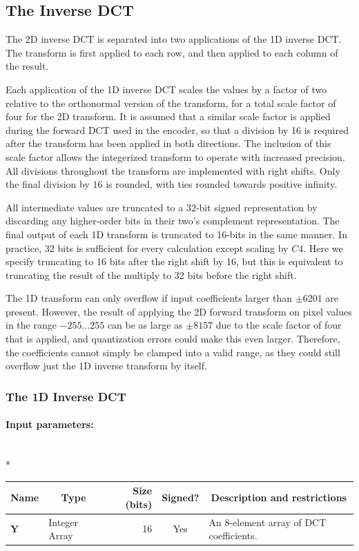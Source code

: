 \documentclass[9pt,letterpaper]{book}
\newcommand{\bitvar}[1]{\ensuremath{\mathbf{\bm{#1}}}}
\numberwithin{equation}{chapter}
\numberwithin{figure}{chapter}
\numberwithin{table}{chapter}
\begin{document}
\subsection{The Inverse DCT}

The 2D inverse DCT is separated into two applications of the 1D inverse DCT.
The transform is first applied to each row, and then applied to each column of
 the result.

Each application of the 1D inverse DCT scales the values by a factor of two
 relative to the orthonormal version of the transform, for a total scale factor
 of four for the 2D transform.
It is assumed that a similar scale factor is applied during the forward DCT
 used in the encoder, so that a division by 16 is required after the transform
 has been applied in both directions.
The inclusion of this scale factor allows the integerized transform to operate
 with increased precision.
All divisions throughout the transform are implemented with right shifts.
Only the final division by $16$ is rounded, with ties rounded towards positive
 infinity.

All intermediate values are truncated to a 32-bit signed representation by
 discarding any higher-order bits in their two's complement representation.
The final output of each 1D transform is truncated to 16-bits in the same
 manner.
In practice, 32 bits is sufficient for every calculation except scaling by
 $C4$.
Here we specify truncating to 16 bits after the right shift by 16, but this is
 equivalent to truncating the result of the multiply to 32 bits before the
 right shift.

The 1D transform can only overflow if input coefficients larger than $\pm 6201$
 are present.
However, the result of applying the 2D forward transform on pixel values in the
 range $-255\ldots 255$ can be as large as $\pm 8157$ due to the scale factor
 of four that is applied, and quantization errors could make this even larger.
Therefore, the coefficients cannot simply be clamped into a valid range, as
 they could still overflow just the 1D inverse transform by itself.

\subsubsection{The 1D Inverse DCT}
\label{sub:1d-idct}

\paragraph{Input parameters:}\hfill\\*
\begin{tabularx}{\textwidth}{@{}llrcX@{}}\toprule
\multicolumn{1}{c}{Name} &
\multicolumn{1}{c}{Type} &
\multicolumn{1}{p{30pt}}{\centering Size (bits)} &
\multicolumn{1}{c}{Signed?} &
\multicolumn{1}{c}{Description and restrictions} \\\midrule\endhead
\bitvar{Y}        & \multicolumn{1}{p{40pt}}{Integer Array} &
                              16 & Yes & An 8-element array of DCT
 coefficients. \\
\bottomrule\end{tabularx}
\end{document}
